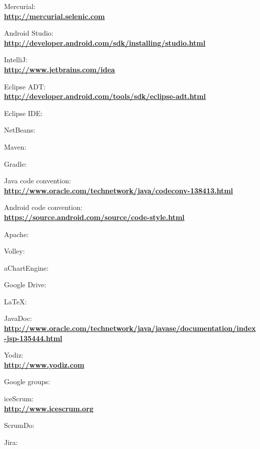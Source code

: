 \begin{thebibliography}{1}
 Mercurial:\\
\textbf{ \url{http://mercurial.selenic.com}}

 Android Studio:\\
\textbf{ \url{http://developer.android.com/sdk/installing/studio.html}}

 IntelliJ:\\
\textbf{ \url{http://www.jetbrains.com/idea}}

 Eclipse ADT:\\
\textbf{ \url{http://developer.android.com/tools/sdk/eclipse-adt.html}}

 Eclipse IDE:\\
\textbf{ \url{}}

 NetBeans:\\
\textbf{ \url{}}

 Maven:\\
\textbf{ \url{}}

 Gradle:\\
\textbf{ \url{}}

 Java code convention:\\
\textbf{ \url{http://www.oracle.com/technetwork/java/codeconv-138413.html}}

 Android code convention:\\
\textbf{ \url{https://source.android.com/source/code-style.html}}

 Apache:\\
\textbf{ \url{}}

 Volley:\\
\textbf{ \url{}}

 aChartEngine:\\
\textbf{ \url{}}

 Google Drive:\\
\textbf{ \url{}}

 LaTeX:\\
\textbf{ \url{}}

 JavaDoc:\\
\textbf{ \url{http://www.oracle.com/technetwork/java/javase/documentation/index-jsp-135444.html}}

 Yodiz: \\
\textbf{ \url{ http://www.yodiz.com}}

 Google groups: \\
\textbf{ \url{}}

 iceScrum: \\
\textbf{ \url{http://www.icescrum.org}}

 ScrumDo:\\
\textbf{ \url{}}

 Jira:\\
\textbf{ \url{}}

\end{thebibliography}
